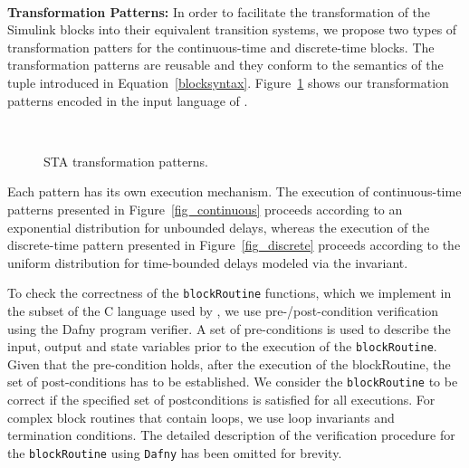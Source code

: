 \noindent\\ \textbf{Transformation Patterns: } In order to facilitate the transformation of the Simulink blocks into their equivalent transition systems, we propose two types of transformation patters for the continuous-time and discrete-time blocks. The transformation patterns are reusable and they conform to the semantics of the tuple introduced in Equation~\ref{blocksyntax}. Figure~\ref{fig_patterns} shows our transformation patterns encoded in the input language of \uppaalsmc.
\begin{figure}[] 
	\centering
	 ~
	\caption{STA transformation patterns.} 
	\label{fig_patterns}
\end{figure}

Each pattern has its own execution mechanism. The execution of continuous-time patterns presented in Figure~\ref{fig_continuous} proceeds according to an exponential distribution for unbounded delays, whereas the execution of the discrete-time pattern presented in Figure~\ref{fig_discrete} proceeds according to the uniform distribution for time-bounded delays modeled via the invariant.

To check the correctness of the \texttt{blockRoutine} functions, which we implement in the subset of the C language used by \uppaalsmc{}, we use pre-/post-condition verification using the Dafny program verifier. A set of pre-conditions is used to describe the input, output and state variables prior to the execution of the \texttt{blockRoutine}. Given that the pre-condition holds, after the execution of the blockRoutine, the set of post-conditions has to be established. We consider the \texttt{blockRoutine} to be correct if the specified set of postconditions is satisfied for all executions. For complex block routines that contain loops, we use loop invariants and termination conditions. The detailed description of the verification procedure for the \texttt{blockRoutine} using \texttt{Dafny} has been omitted for brevity. 

